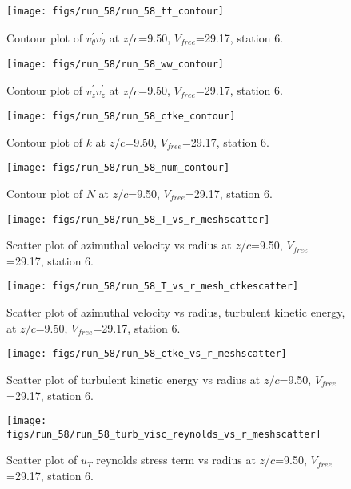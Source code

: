 \begin{figure}[H]
\centering
\texttt{[image: figs/run\_58/run\_58\_tt\_contour]}
\caption{Contour plot of $\overline{v_{\theta}^{\prime} v_{\theta}^{\prime}}$ at $z/c$=9.50, $V_{free}$=29.17, station 6.}
\end{figure}


\begin{figure}[H]
\centering
\texttt{[image: figs/run\_58/run\_58\_ww\_contour]}
\caption{Contour plot of $\overline{v_{z}^{\prime} v_{z}^{\prime}}$ at $z/c$=9.50, $V_{free}$=29.17, station 6.}
\end{figure}


\begin{figure}[H]
\centering
\texttt{[image: figs/run\_58/run\_58\_ctke\_contour]}
\caption{Contour plot of $k$ at $z/c$=9.50, $V_{free}$=29.17, station 6.}
\end{figure}


\begin{figure}[H]
\centering
\texttt{[image: figs/run\_58/run\_58\_num\_contour]}
\caption{Contour plot of $N$ at $z/c$=9.50, $V_{free}$=29.17, station 6.}
\end{figure}


\begin{figure}[H]
\centering
\texttt{[image: figs/run\_58/run\_58\_T\_vs\_r\_meshscatter]}
\caption{Scatter plot of azimuthal velocity vs radius at $z/c$=9.50, $V_{free}$=29.17, station 6.}
\end{figure}


\begin{figure}[H]
\centering
\texttt{[image: figs/run\_58/run\_58\_T\_vs\_r\_mesh\_ctkescatter]}
\caption{Scatter plot of azimuthal velocity vs radius, turbulent kinetic energy, at $z/c$=9.50, $V_{free}$=29.17, station 6.}
\end{figure}


\begin{figure}[H]
\centering
\texttt{[image: figs/run\_58/run\_58\_ctke\_vs\_r\_meshscatter]}
\caption{Scatter plot of turbulent kinetic energy vs radius at $z/c$=9.50, $V_{free}$=29.17, station 6.}
\end{figure}


\begin{figure}[H]
\centering
\texttt{[image: figs/run\_58/run\_58\_turb\_visc\_reynolds\_vs\_r\_meshscatter]}
\caption{Scatter plot of $
u_T$ reynolds stress term vs radius at $z/c$=9.50, $V_{free}$=29.17, station 6.}
\end{figure}


